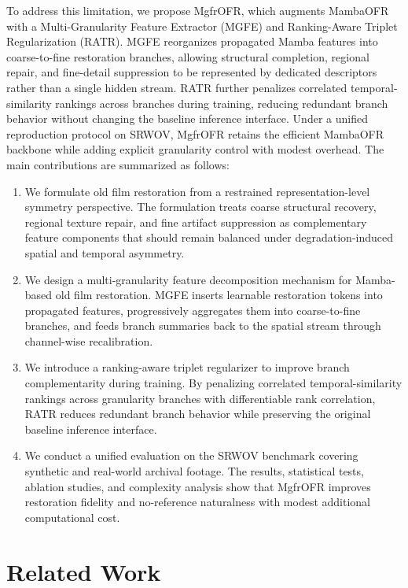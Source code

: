 \documentclass[symmetry,article,submit,pdftex,moreauthors]{Definitions/mdpi}
\begin{document}
To address this limitation, we propose MgfrOFR, which augments MambaOFR with a Multi-Granularity Feature Extractor (MGFE) and Ranking-Aware Triplet Regularization (RATR). MGFE reorganizes propagated Mamba features into coarse-to-fine restoration branches, allowing structural completion, regional repair, and fine-detail suppression to be represented by dedicated descriptors rather than a single hidden stream. RATR further penalizes correlated temporal-similarity rankings across branches during training, reducing redundant branch behavior without changing the baseline inference interface. Under a unified reproduction protocol on SRWOV, MgfrOFR retains the efficient MambaOFR backbone while adding explicit granularity control with modest overhead. The main contributions are summarized as follows:
\begin{enumerate}
    \item We formulate old film restoration from a restrained representation-level symmetry perspective. The formulation treats coarse structural recovery, regional texture repair, and fine artifact suppression as complementary feature components that should remain balanced under degradation-induced spatial and temporal asymmetry.
    \item We design a multi-granularity feature decomposition mechanism for Mamba-based old film restoration. MGFE inserts learnable restoration tokens into propagated features, progressively aggregates them into coarse-to-fine branches, and feeds branch summaries back to the spatial stream through channel-wise recalibration.
    \item We introduce a ranking-aware triplet regularizer to improve branch complementarity during training. By penalizing correlated temporal-similarity rankings across granularity branches with differentiable rank correlation, RATR reduces redundant branch behavior while preserving the original baseline inference interface.
    \item We conduct a unified evaluation on the SRWOV benchmark covering synthetic and real-world archival footage. The results, statistical tests, ablation studies, and complexity analysis show that MgfrOFR improves restoration fidelity and no-reference naturalness with modest additional computational cost.
\end{enumerate}
\section{Related Work}
\label{sec:related}
\end{document}
